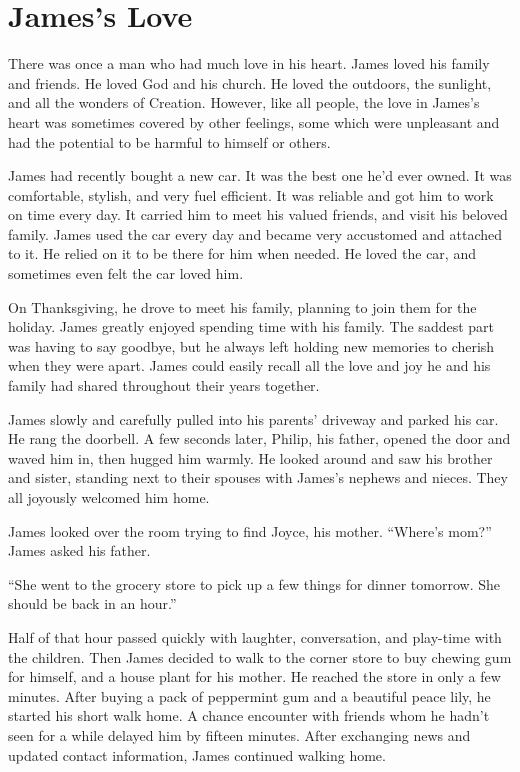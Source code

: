 \chapter{James's Love}

There was once a man who had much love in his heart. James loved his family and friends. He loved God and his church. He loved the outdoors, the sunlight, and all the wonders of Creation. However, like all people, the love in James's heart was sometimes covered by other feelings, some which were unpleasant and had the potential to be harmful to himself or others.

James had recently bought a new car. It was the best one he'd ever owned. It was comfortable, stylish, and very fuel efficient. It was reliable and got him to work on time every day. It carried him to meet his valued friends, and visit his beloved family. James used the car every day and became very accustomed and attached to it. He relied on it to be there for him when needed. He loved the car, and sometimes even felt the car loved him.

On Thanksgiving, he drove to meet his family, planning to join them for the holiday. James greatly enjoyed spending time with his family. The saddest part was having to say goodbye, but he always left holding new memories to cherish when they were apart. James could easily recall all the love and joy he and his family had shared throughout their years together.

James slowly and carefully pulled into his parents' driveway and parked his car. He rang the doorbell. A few seconds later, Philip, his father, opened the door and waved him in, then hugged him warmly. He looked around and saw his brother and sister, standing next to their spouses with James's nephews and nieces. They all joyously welcomed him home.

James looked over the room trying to find Joyce, his mother. “Where's mom?” James asked his father.

“She went to the grocery store to pick up a few things for dinner tomorrow. She should be back in an hour.”

Half of that hour passed quickly with laughter, conversation, and play-time with the children. Then James decided to walk to the corner store to buy chewing gum for himself, and a house plant for his mother. He reached the store in only a few minutes. After buying a pack of peppermint gum and a beautiful peace lily, he started his short walk home. A chance encounter with friends whom he hadn't seen for a while delayed him by fifteen minutes. After exchanging news and updated contact information, James continued walking home.


